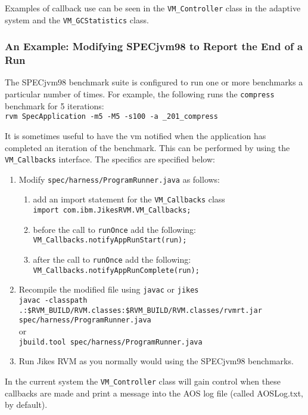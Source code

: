 Examples of callback use can be seen in the {\tt VM\_Controller} class in the
adaptive system and the {\tt VM\_GCStatistics} class.

\subsubsection{An Example: Modifying SPECjvm98 to Report the End of a
Run}\label{sssec:callback-example}
The SPECjvm\R{}98 benchmark suite is configured to run one or more benchmarks
a particular number of times.  For example, the following runs the
{\tt compress} benchmark for 5 iterations:\\
{\tt rvm SpecApplication -m5 -M5 -s100 -a \_201\_compress}

It is sometimes useful to have the vm notified when the application
has completed an iteration of the benchmark.   This can be performed
by using the {\tt VM\_Callbacks} interface.  The specifics are
specified below:
\begin{enumerate}
\item Modify {\tt spec/harness/ProgramRunner.java} as follows:
	\begin{enumerate}
	\item add an import statement for the {\tt VM\_Callbacks} class \\
    {\tt import com.ibm.JikesRVM.VM\_Callbacks;}
	\item before the call to {\tt runOnce} add the following: \\
    {\tt VM\_Callbacks.notifyAppRunStart(run);}
	\item after the call to {\tt runOnce} add the following: \\	
    {\tt VM\_Callbacks.notifyAppRunComplete(run);}
	\end{enumerate}

\item Recompile the modified file using {\tt javac} or {\tt jikes} \\
   {\tt javac -classpath 
   .:\$RVM\_BUILD/RVM.classes:\$RVM\_BUILD/RVM.classes/rvmrt.jar
   spec/harness/ProgramRunner.java} \\
or \\
   {\tt jbuild.tool spec/harness/ProgramRunner.java} \\

\item Run Jikes RVM as you normally would using the SPECjvm98 benchmarks.
\end{enumerate}

In the current system the {\tt VM\_Controller} class will gain control
when these callbacks are made and print a message into the AOS log
file (called AOSLog.txt, by default).

\JikesTMFooter
